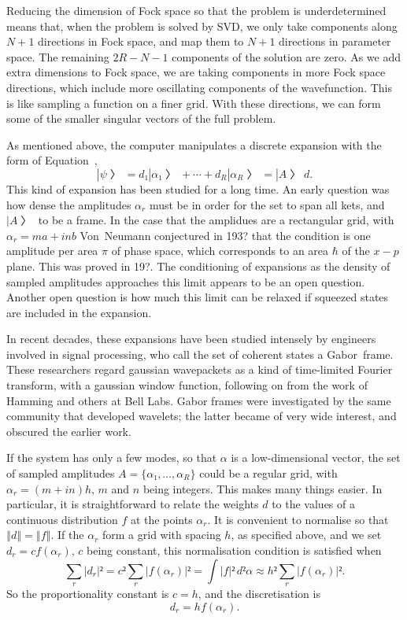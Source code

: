 Reducing the dimension of Fock space so that the problem is underdetermined means that, when the problem is solved by SVD, we only take components along $N+1$ directions in Fock space, and map them to $N+1$ directions in parameter space.  The remaining $2R-N-1$ components of the solution are zero.  As we add extra dimensions to Fock space, we are taking components in more Fock space directions, which include more oscillating components of the wavefunction.  This is like sampling a function on a finer grid.  With these directions, we can form some of the smaller singular vectors of the full problem.


As mentioned above, the computer manipulates a discrete expansion with the form of Equation~\Ad,
$$|ψ〉=d₁|α₁〉+⋯+d_R|α_R〉=|A〉d.$$
This kind of expansion has been studied for a long time.  An early question was how dense the amplitudes $α_r$ must be in order for the set to span all kets, and $|A〉$ to be a frame.  In the case that the amplidues are a rectangular grid, with $α_r=ma+inb$ Von~Neumann conjectured in 193? that the condition is one amplitude per area $π$ of phase space, which corresponds to an area $\hbar$ of the $x-p$ plane.  This was proved in 19?.  The conditioning of expansions as the density of sampled amplitudes approaches this limit appears to be an open question.  Another open question is how much this limit can be relaxed if squeezed states are included in the expansion.

In recent decades, these expansions have been studied intensely by engineers involved in signal processing, who call the set of coherent states a Gabor~frame.  These researchers regard gaussian wavepackets as a kind of time-limited Fourier transform, with a gaussian window function, following on from the work of Hamming and others at Bell Labs.  Gabor frames were investigated by the same community that developed wavelets; the latter became of very wide interest, and obscured the earlier work.

If the system has only a few modes, so that $α$ is a low-dimensional vector, the set of sampled amplitudes $A=\{α₁, …,α_R\}$ could be a regular grid, with $α_r=(m+in)h$, $m$ and $n$ being integers.  This makes many things easier.  In particular, it is straightforward to relate the weights $d$ to the values of a continuous distribution $f$ at the points $α_r$.  It is convenient to normalise so that $‖d‖=‖f‖$.  If the $α_r$ form a grid with spacing $h$, as specified above, and we set $d_r=cf(α_r)$, $c$ being constant, this normalisation condition is satisfied when
$$∑_r|d_r|²=c²∑_r|f(α_r)|²=\int |f|²\,d²α≈h²∑_r|f(α_r)|².$$
So the proportionality constant is $c=h$, and the discretisation is
$$d_r=hf(α_r).$$

